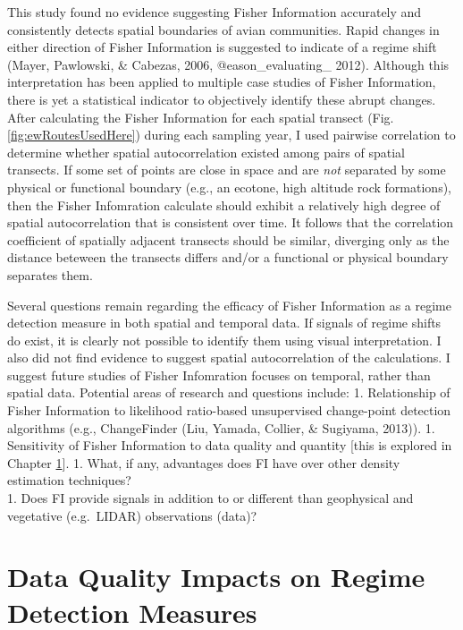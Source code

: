 \documentclass[12pt,twoside,openany]{reedthesis}
\begin{document}
This study found no evidence suggesting Fisher Information accurately and consistently detects spatial boundaries of avian communities. Rapid changes in either direction of Fisher Information is suggested to indicate of a regime shift (Mayer, Pawlowski, \& Cabezas, 2006, @eason\_evaluating\_ 2012). Although this interpretation has been applied to multiple case studies of Fisher Information, there is yet a statistical indicator to objectively identify these abrupt changes. After calculating the Fisher Information for each spatial transect (Fig. \ref{fig:ewRoutesUsedHere}) during each sampling year, I used pairwise correlation to determine whether spatial autocorrelation existed among pairs of spatial transects. If some set of points are close in space and are \emph{not} separated by some physical or functional boundary (e.g., an ecotone, high altitude rock formations), then the Fisher Infomration calculate should exhibit a relatively high degree of spatial autocorrelation that is consistent over time. It follows that the correlation coefficient of spatially adjacent transects should be similar, diverging only as the distance beteween the transects differs and/or a functional or physical boundary separates them.

Several questions remain regarding the efficacy of Fisher Information as a regime detection measure in both spatial and temporal data. If signals of regime shifts do exist, it is clearly not possible to identify them using visual interpretation. I also did not find evidence to suggest spatial autocorrelation of the calculations. I suggest future studies of Fisher Infomration focuses on temporal, rather than spatial data. Potential areas of research and questions include:
1. Relationship of Fisher Information to likelihood ratio-based unsupervised change-point detection algorithms (e.g., ChangeFinder (Liu, Yamada, Collier, \& Sugiyama, 2013)).
1. Sensitivity of Fisher Information to data quality and quantity {[}this is explored in Chapter \ref{resampling}{]}.
1. What, if any, advantages does FI have over other density estimation techniques?\\
1. Does FI provide signals in addition to or different than geophysical and vegetative (e.g.~LIDAR) observations (data)?

\hypertarget{resampling}{%
\chapter{Data Quality Impacts on Regime Detection Measures}\label{resampling}}
\end{document}
